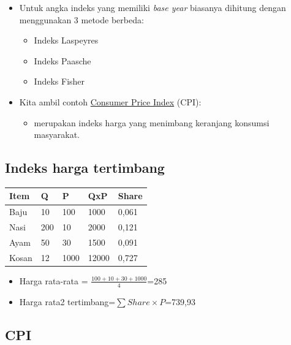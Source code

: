 \documentclass[
  letterpaper,
  DIV=11,
  numbers=noendperiod]{scrartcl}
\providecommand{\tightlist}{%
  \setlength{\itemsep}{0pt}\setlength{\parskip}{0pt}}\usepackage{longtable,booktabs,array}
\begin{document}
\begin{itemize}
\item
  Untuk angka indeks yang memiliki \emph{base year} biasanya dihitung
  dengan menggunakan 3 metode berbeda:

  \begin{itemize}
  \item
    Indeks Laspeyres
  \item
    Indeks Paasche
  \item
    Indeks Fisher
  \end{itemize}
\item
  Kita ambil contoh
  \href{https://www.bps.go.id/id/statistics-table/2/MTcwOSMy/indeks-harga-konsumen-90-kota--umum-.html}{Consumer
  Price Index} (CPI):

  \begin{itemize}
  \tightlist
  \item
    merupakan indeks harga yang menimbang keranjang konsumsi masyarakat.
  \end{itemize}
\end{itemize}

\hypertarget{indeks-harga-tertimbang}{%
\subsection{Indeks harga tertimbang}\label{indeks-harga-tertimbang}}

\begin{longtable}[]{@{}lllll@{}}
\toprule\noalign{}
Item & Q & P & QxP & Share \\
\midrule\noalign{}
\endhead
\bottomrule\noalign{}
\endlastfoot
Baju & 10 & 100 & 1000 & 0,061 \\
Nasi & 200 & 10 & 2000 & 0,121 \\
Ayam & 50 & 30 & 1500 & 0,091 \\
Kosan & 12 & 1000 & 12000 & 0,727 \\
\end{longtable}

\begin{itemize}
\item
  Harga rata-rata = \(\frac{100+10+30+1000}{4}\)=285
\item
  Harga rata2 tertimbang=\(\sum Share \times P\)=739,93
\end{itemize}

\hypertarget{cpi}{%
\subsection{CPI}\label{cpi}}
\end{document}

